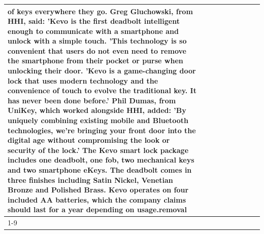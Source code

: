 \begin{table}[H]
\begin{tabular}{lllrlllll}
of keys everywhere they go. Greg Gluchowski, from HHI, said: 'Kevo is the first deadbolt intelligent enough to communicate with a smartphone and unlock with a simple touch. 'This technology is so convenient that users do not even need to remove the smartphone from their pocket or purse when unlocking their door. 'Kevo is a game-changing door lock that uses modern technology and the convenience of touch to evolve the traditional key. It has never been done before.' Phil Dumas, from UniKey, which worked alongside HHI, added: 'By uniquely combining existing mobile and Bluetooth technologies, we’re bringing your front door into the digital age without compromising the look or security of the lock.' The Kevo smart lock package includes one deadbolt, one fob, two mechanical keys and two smartphone eKeys. The deadbolt comes in three finishes including Satin Nickel, Venetian Bronze and Polished Brass. Kevo operates on four included AA batteries, which the company claims should last for a year depending on usage.removal \\
\cline{1-9}

\end{tabular}
\end{table}
